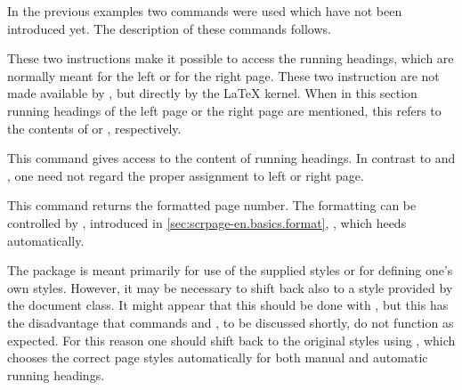 In the previous examples two commands were used which have not been
introduced yet. The description of these commands follows.

\begin{Declaration}
\end{Declaration}%
These two instructions make it possible to access the running headings, which
are normally meant for the left or for the right page. These two instruction
are not made available by , but directly by the {\LaTeX}
kernel. When in this section running headings of the left page or the right
page are mentioned, this refers to the contents of  or
, respectively.
%
\EndIndexGroup


\begin{Declaration}
\end{Declaration}%
This command gives access to the content of running headings.  In
contrast to  and , one need not
regard the proper assignment to left or right page.%
%
\EndIndexGroup


\begin{Declaration}
\end{Declaration}%
This command returns the formatted page number. The formatting can be
controlled by , introduced in
\autoref{sec:scrpage-en.basics.format}, ,
which  heeds automatically.%
%
\EndIndexGroup


\begin{Declaration}
\end{Declaration}%
The package  is meant primarily for use of the supplied
styles or for defining one's own styles. However, it may be necessary to shift
back also to a style provided by the document class.  It might appear that
this should be done with
, but this has the
disadvantage that commands  and , to be
discussed shortly, do not function as expected.  For this reason one should
shift back to the original styles using
, which chooses
the correct page styles automatically for both manual and automatic running
headings.%
%
\EndIndexGroup


